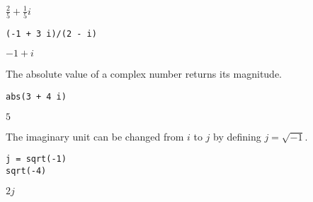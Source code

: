 \noindent
$\tfrac{2}{5}+\frac{1}{5}i$

{\color{blue}
\begin{verbatim}
(-1 + 3 i)/(2 - i)
\end{verbatim}
}

\noindent
$-1+i$

\bigskip
\noindent
The absolute value of a complex number returns its magnitude.

{\color{blue}
\begin{verbatim}
abs(3 + 4 i)
\end{verbatim}
}

\noindent
$5$

\bigskip
\noindent
The imaginary unit can be changed from $i$ to $j$
by defining $j=\sqrt{-1}$.

{\color{blue}
\begin{verbatim}
j = sqrt(-1)
sqrt(-4)
\end{verbatim}
}

\noindent
$\displaystyle 2j$
